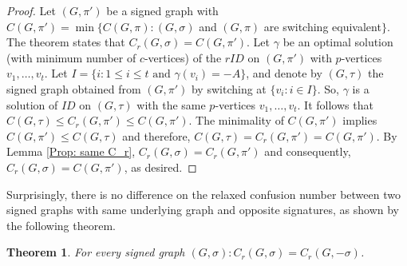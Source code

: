 \documentclass[a4paper,11pt]{article}
\newtheorem{theo}[defi]{Theorem}
\theoremstyle{remark}
\begin{document}
\begin{proof}
  Let $(G,\pi')$ be a signed graph with 
  $C(G,\pi') = \min \{C(G,\pi) \colon (G,\sigma)$ and  $(G,\pi)$ are switching equivalent$\}.$
  The theorem states that $C_r(G,\sigma)=C(G,\pi')$.
  Let $\gamma$ be an optimal solution (with minimum number of $c$-vertices) of the $rID$ on $(G,\pi')$  with $p$-vertices $v_1,\ldots,v_t$.
  Let $I=\{i\colon 1\leq i\leq t \text{ and } \gamma(v_i)=-A\}$, and denote by $(G,\tau)$ the signed graph obtained from $(G,\pi')$ by switching at $\{v_i\colon i\in I\}$. So, $\gamma$ is a solution of $ID$ on $(G,\tau)$ with the same $p$-vertices $v_1,\ldots,v_t$.
  It follows that $C(G,\tau)\leq C_r(G,\pi') \leq C(G,\pi')$.
  The minimality of $C(G,\pi')$ implies $C(G,\pi') \leq C(G,\tau)$ and
  therefore, $C(G,\tau)=C_r(G,\pi')=C(G,\pi')$.
  By Lemma \ref{Prop: same C_r}, $C_r(G,\sigma)=C_r(G,\pi')$ and
  consequently, $C_r(G,\sigma)=C(G,\pi')$, as desired.
\end{proof}

Surprisingly, there is no difference on the relaxed confusion number between two signed graphs with same underlying graph and opposite signatures, as shown by the following theorem.

\begin{theo} \label{Theo: C_r(G,s)=C_r(G,-s)}
 For every signed graph 
 $(G,\sigma) \colon C_r(G,\sigma) = C_r(G,-\sigma)$.
\end{theo}
\end{document}

